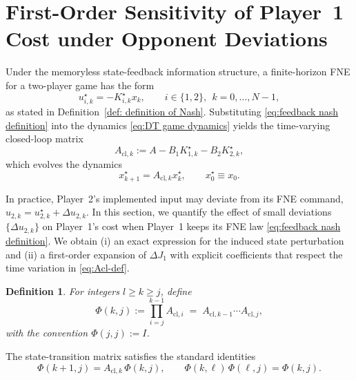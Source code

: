 \documentclass[letterpaper, 10 pt, conference]{ieeeconf}  %
\newtheorem{definition}{\textbf{Definition}}
\begin{document}
\section{First-Order Sensitivity of Player~1 Cost under Opponent Deviations}
\label{sec:error-on-nash-equilibria}
Under the memoryless state-feedback information structure, a finite-horizon
FNE for a two-player game has the form
\begin{equation}
\label{eq:feedback nash definition}
u^\star_{i,k} = -K^\star_{i,k} x_k, \qquad i\in\{1,2\},\ \ k=0,\dots,N-1,
\end{equation}
as stated in Definition~\ref{def: definition of Nash}.
Substituting \eqref{eq:feedback nash definition} into the dynamics \eqref{eq:DT game dynamics} yields the
time-varying closed-loop matrix
\begin{equation}
\label{eq:Acl-def}
A_{\mathrm{cl},k} := A - B_1 K^\star_{1,k} - B_2 K^\star_{2,k},
\end{equation}
which evolves the dynamics
\begin{equation}
\label{eq:closed-loop Nash dynamic}
x_{k+1}^\star = A_{\mathrm{cl},k} x_k^\star,\qquad x_0^\star \equiv x_0.
\end{equation}

In practice, Player~2’s implemented input may deviate from its FNE command,
$u_{2,k} = u^\star_{2,k} + \Delta u_{2,k}$. In this section, we quantify the
effect of small deviations $\{\Delta u_{2,k}\}$ on Player~1’s cost when
Player~1 keeps its FNE law \eqref{eq:feedback nash definition}. We obtain
(i) an exact expression for the induced state perturbation and
(ii) a first-order expansion of $\Delta J_1$ with explicit coefficients that
respect the time variation in \eqref{eq:Acl-def}.


\begin{definition}
\label{def:phi}
For integers $l\ge k\ge j$, define
\begin{equation*}
\Phi(k,j) := \prod_{i=j}^{k-1} A_{\text{cl},i} \;=\; A_{\text{cl},k-1} \cdots A_{\text{cl},j},
\end{equation*}
with the convention $\Phi(j,j):=I$. 
\end{definition}
The state-transition matrix satisfies the standard identities
\[
\Phi(k+1,j)=A_{\text{cl},k}\,\Phi(k,j), \qquad\Phi(k,\ell)\,\Phi(\ell,j)=\Phi(k,j).
\]
\end{document}
